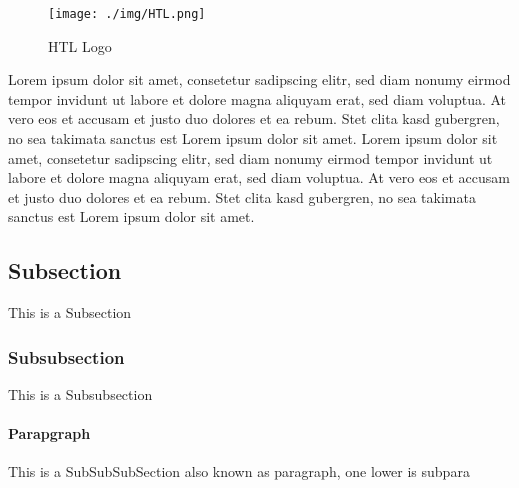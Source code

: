 \documentclass[12pt]{article}
\newcommand{\para}[1]{\paragraph{#1}\mbox{}}                                                %
\begin{document}
\begin{figure}[h]                                                                           %
    \centering
    \texttt{[image: ./img/HTL.png]}                                             %
    \caption{HTL Logo\cite{picture_HTL.png}}                                                    %
    \label{fig:figure1}                                                                     %
\end{figure}

Lorem ipsum dolor sit amet, consetetur sadipscing elitr, sed diam nonumy eirmod tempor invidunt ut labore et dolore magna 
aliquyam erat, sed diam voluptua. At vero eos et accusam et justo duo dolores et ea rebum. Stet clita kasd gubergren, no 
sea takimata sanctus est Lorem ipsum dolor sit amet. Lorem ipsum dolor sit amet, consetetur sadipscing elitr, sed diam nonumy 
eirmod tempor invidunt ut labore et dolore magna aliquyam erat, sed diam voluptua. At vero eos et accusam et justo duo dolores 
et ea rebum. Stet clita kasd gubergren, no sea takimata sanctus est Lorem ipsum dolor sit amet. \cite{Lorem1}


\clearpage




\subsection{Subsection}

\par 
This is a Subsection



\subsubsection{Subsubsection}

\par
This is a Subsubsection

\para{Parapgraph} 

\par 
This is a SubSubSubSection also known as paragraph, one lower is subpara
\end{document}
